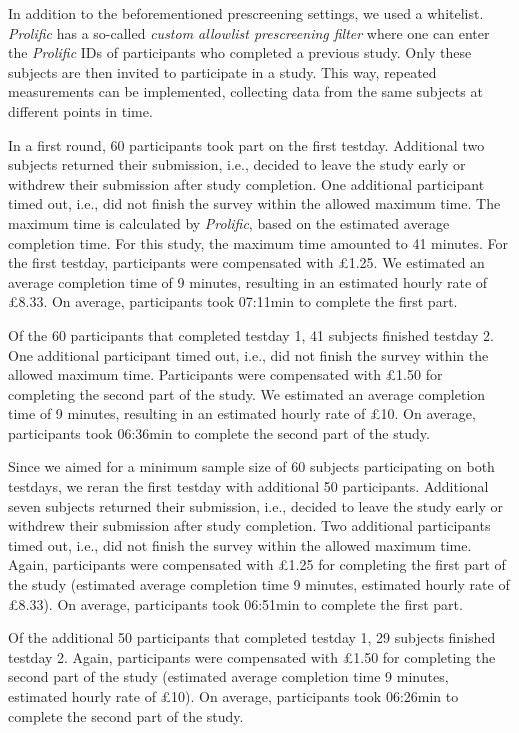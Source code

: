 \documentclass[
  man,floatsintext]{apa6}
\begin{document}
In addition to the beforementioned prescreening settings, we used a whitelist.
\emph{Prolific} has a so-called \emph{custom allowlist prescreening filter} where one can enter the \emph{Prolific} IDs of participants who completed a previous study.
Only these subjects are then invited to participate in a study.
This way, repeated measurements can be implemented, collecting data from the same subjects at different points in time.

In a first round, 60 participants took part on the first testday.
Additional two subjects returned their submission, i.e., decided to leave the study early or withdrew their submission after study completion.
One additional participant timed out, i.e., did not finish the survey within the allowed maximum time.
The maximum time is calculated by \emph{Prolific}, based on the estimated average completion time.
For this study, the maximum time amounted to 41 minutes.
For the first testday, participants were compensated with £1.25.
We estimated an average completion time of 9 minutes, resulting in an estimated hourly rate of £8.33.
On average, participants took 07:11min to complete the first part.

Of the 60 participants that completed testday 1, 41 subjects finished testday 2.
One additional participant timed out, i.e., did not finish the survey within the allowed maximum time.
Participants were compensated with £1.50 for completing the second part of the study.
We estimated an average completion time of 9 minutes, resulting in an estimated hourly rate of £10.
On average, participants took 06:36min to complete the second part of the study.

Since we aimed for a minimum sample size of 60 subjects participating on both testdays, we reran the first testday with additional 50 participants.
Additional seven subjects returned their submission, i.e., decided to leave the study early or withdrew their submission after study completion.
Two additional participants timed out, i.e., did not finish the survey within the allowed maximum time.
Again, participants were compensated with £1.25 for completing the first part of the study (estimated average completion time 9 minutes, estimated hourly rate of £8.33).
On average, participants took 06:51min to complete the first part.

Of the additional 50 participants that completed testday 1, 29 subjects finished testday 2.
Again, participants were compensated with £1.50 for completing the second part of the study (estimated average completion time 9 minutes, estimated hourly rate of £10).
On average, participants took 06:26min to complete the second part of the study.
\end{document}
